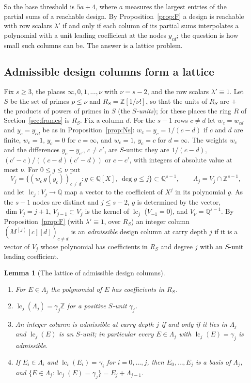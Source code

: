 \documentclass[11pt]{amsart}
\newtheorem{lemma}[theorem]{Lemma}
\theoremstyle{definition}
\theoremstyle{plain}
\newcommand{\Z}{\mathbb{Z}}
\begin{document}
So the base threshold is $5a+4$, where $a$ measures the largest entries of the partial sums of a reachable design. By Proposition~\ref{prop:F} a design is reachable with row scalars $\lambda'$ if and only if each column of its partial sums interpolates a polynomial with a unit leading coefficient at the nodes $y_{cd}$; the question is how small such columns can be. The answer is a lattice problem.

\subsection{Admissible design columns form a lattice}\label{sec:lattice}
Fix $s\ge3$, the places $\infty,0,1,\dots,\nu$ with $\nu=s-2$, and the row scalars $\lambda'\equiv1$. Let $S$ be the set of primes $p\le \nu$ and $R_S=\Z[1/\nu!]$, so that the units of $R_S$ are $\pm$ the products of powers of primes in $S$ (the \emph{$S$-units}); for these places the ring $R$ of Section~\ref{sec:frames} is $R_S$. Fix a column $d$. For the $s-1$ rows $c\ne d$ let $w_c=w_{cd}$ and $y_c=y_{cd}$ be as in Proposition~\ref{prop:Ns}: $w_c=y_c=1/(c-d)$ if $c$ and $d$ are finite, $w_c=1$, $y_c=0$ for $c=\infty$, and $w_c=1$, $y_c=c$ for $d=\infty$. The weights $w_c$ and the differences $y_c-y_{c'}$, $c\ne c'$, are $S$-units: they are $1/(c-d)$, $(c'-c)/((c-d)(c'-d))$ or $c-c'$, with integers of absolute value at most $\nu$. For $0\le j\le \nu$ put
\[
V_j=\bigl\{(w_c\,g(y_c))_{c\ne d}:g\in\mathbb Q[X],\ \deg g\le j\bigr\}\subset\mathbb Q^{s-1},\qquad \Lambda_j=V_j\cap\Z^{s-1},
\]
and let $\operatorname{lc}_j:V_j\to\mathbb Q$ map a vector to the coefficient of $X^j$ in its polynomial $g$. As the $s-1$ nodes are distinct and $j\le s-2$, $g$ is determined by the vector, $\dim V_j=j+1$, $V_{j-1}\subset V_j$ is the kernel of $\operatorname{lc}_j$ ($V_{-1}=0$), and $V_\nu=\mathbb Q^{s-1}$. By Proposition~\ref{prop:F} (with $\lambda'\equiv1$, over $R_S$) an integer column $(M^{(j)}[c][d])_{c\ne d}$ is an \emph{admissible} design column at carry depth $j$ if it is a vector of $V_j$ whose polynomial has coefficients in $R_S$ and degree $j$ with an $S$-unit leading coefficient.

\begin{lemma}[The lattice of admissible design columns]\label{lem:sat}
\begin{enumerate}
\item[(i)] For $E\in\Lambda_j$ the polynomial of $E$ has coefficients in $R_S$.
\item[(ii)] $\operatorname{lc}_j(\Lambda_j)=\gamma_j\Z$ for a positive $S$-unit $\gamma_j$.
\item[(iii)] An integer column is admissible at carry depth $j$ if and only if it lies in $\Lambda_j$ and $\operatorname{lc}_j(E)$ is an $S$-unit; in particular every $E\in\Lambda_j$ with $\operatorname{lc}_j(E)=\gamma_j$ is admissible.
\item[(iv)] If $E_i\in\Lambda_i$ and $\operatorname{lc}_i(E_i)=\gamma_i$ for $i=0,\dots,j$, then $E_0,\dots,E_j$ is a basis of $\Lambda_j$, and $\{E\in\Lambda_j:\operatorname{lc}_j(E)=\gamma_j\}=E_j+\Lambda_{j-1}$.
\end{enumerate}
\end{lemma}
\end{document}
